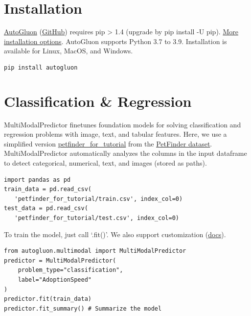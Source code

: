 \section*{Installation}
\href{https://auto.gluon.ai/stable/index.html}{AutoGluon} (\href{https://github.com/awslabs/autogluon/}{GitHub}) requires pip > 1.4 (upgrade by pip install -U pip). \href{https://auto.gluon.ai/stable/index.html#installation}{More installation options}. AutoGluon supports Python 3.7 to 3.9. Installation is available for Linux, MacOS, and Windows.

\begin{verbatim}
pip install autogluon
\end{verbatim}


\section*{Classification \& Regression}
MultiModalPredictor finetunes foundation models for solving classification and regression problems with image, text, and tabular features. Here, we use a simplified version \href{https://automl-mm-bench.s3.amazonaws.com/petfinder_for_tutorial.zip}{petfinder\_for\_tutorial} from the \href{https://www.kaggle.com/c/petfinder-adoption-prediction}{PetFinder dataset}. MultiModalPredictor automatically analyzes the columns in the input dataframe to detect categorical, numerical, text, and images (stored as paths).
\begin{verbatim}
import pandas as pd
train_data = pd.read_csv(
   'petfinder_for_tutorial/train.csv', index_col=0)
test_data = pd.read_csv(
   'petfinder_for_tutorial/test.csv', index_col=0)
\end{verbatim}

To train the model, just call `.fit()'. We also support customization (\href{https://auto.gluon.ai/stable/tutorials/multimodal/advanced_topics/customization.html}{docs}).

\begin{verbatim}
from autogluon.multimodal import MultiModalPredictor
predictor = MultiModalPredictor(
    problem_type="classification", 
    label="AdoptionSpeed"
)
predictor.fit(train_data)
predictor.fit_summary() # Summarize the model
\end{verbatim}

